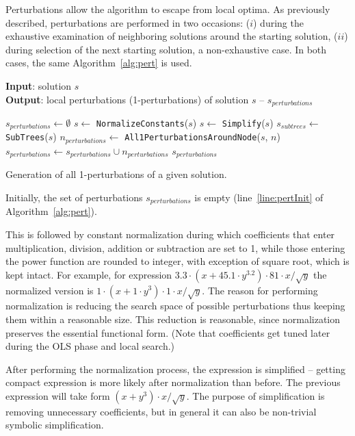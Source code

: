 \documentclass[a4paper,12pt]{elsarticle}
\begin{document}
Perturbations allow the algorithm to escape from local optima. As previously described, perturbations are performed in two occasions: ($i$) during the exhaustive examination of neighboring solutions around the starting solution, ($ii$) during selection of the next starting solution, a non-exhaustive case.  
In both cases, the same Algorithm~\ref{alg:pert} is used. 

\begin{algorithm}
	\hspace*{\algorithmicindent} \textbf{Input}: solution $s$ \\
	\hspace*{\algorithmicindent} \textbf{Output}: local perturbations (1-perturbations) of solution $s$ -- $s_{perturbations}$
	\begin{algorithmic}[1] 
		\State $s_{perturbations} \gets \emptyset$ \label{line:pertInit}
		\State $s \gets$ \texttt{NormalizeConstants}($s$)
		\State $s \gets$ \texttt{Simplify}($s$)
		\State $s_{subtrees} \gets$ \texttt{SubTrees}($s$)
		 \label{line:forSSStart}
			\State $n_{perturbations} \gets$ \texttt{All1PerturbationsAroundNode}($s$, $n$)
			\State $s_{perturbations} \gets s_{perturbations} \cup n_{perturbations}$	
		\EndFor \label{line:forSSEnd}
		\State \Return $s_{perturbations}$
		\EndProcedure
	\end{algorithmic}
	\caption{Generation of all 1-perturbations of a given solution.}
	\label{alg:pert}
\end{algorithm}  

Initially, the set of perturbations $s_{perturbations}$ is empty (line~\ref{line:pertInit} of Algorithm~\ref{alg:pert}).


This is followed by constant normalization during which coefficients that enter multiplication, division, addition or subtraction are set to 1, while those entering the power function are rounded to integer, with exception of square root, which is kept intact. For example, for expression $3.3\cdot(x+45.1\cdot y^{3.2})\cdot 81\cdot x/\sqrt{y}$ the normalized version is $1\cdot (x+1\cdot y^3)\cdot 1\cdot x/\sqrt{y}$. The reason for performing normalization is reducing the search space of possible perturbations thus keeping them within a reasonable size. This reduction is reasonable, since normalization preserves the essential functional form. (Note that coefficients get tuned later during the OLS phase and local search.)


After performing the normalization process, the expression is simplified -- getting compact expression is more likely after normalization than before. The previous expression will take form $(x+y^3)\cdot x/\sqrt{y}$. The purpose of simplification is removing unnecessary coefficients, but in general it can also be non-trivial symbolic simplification. 
\end{document}
